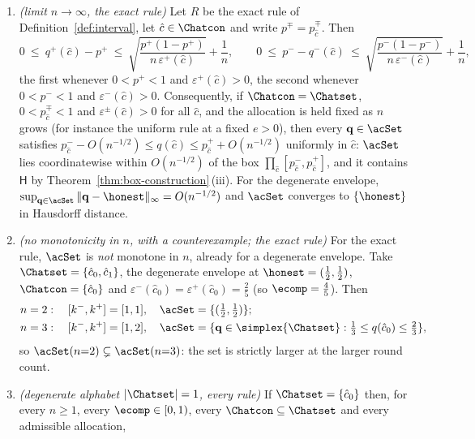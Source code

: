 \begin{theorem}
\begin{enumerate}[label=(\roman*),leftmargin=2.2em]
simplex and no constraint at all.
\item \emph{(limit $n\to\infty$, the exact rule)} Let $R$ be the exact rule
of Definition~\ref{def:interval}, let $\hat c\in\Chatcon$ and write
$p^{\mp}=p^{\mp}_{\hat c}$. Then
\begin{equation}\label{eq:width}
  0\ \le\ q^{+}(\hat c)-p^{+}\ \le\
  \sqrt{\frac{p^{+}(1-p^{+})}{n\,\varepsilon^{+}(\hat c)}}+\frac1n,
  \qquad
  0\ \le\ p^{-}-q^{-}(\hat c)\ \le\
  \sqrt{\frac{p^{-}(1-p^{-})}{n\,\varepsilon^{-}(\hat c)}}+\frac1n ,
\end{equation}
the first whenever $0<p^{+}<1$ and $\varepsilon^{+}(\hat c)>0$, the second
whenever $0<p^{-}<1$ and $\varepsilon^{-}(\hat c)>0$.
Consequently, if $\Chatcon=\Chatset$, $0<p^{\mp}_{\hat c}<1$ and
$\varepsilon^{\pm}(\hat c)>0$ for all $\hat c$, and the allocation is held
fixed as $n$ grows (for instance the uniform rule at a fixed $e>0$), then
every $\mathbf{q}\in\acSet$ satisfies
$p^{-}_{\hat c}-O(n^{-1/2})\le q(\hat c)\le p^{+}_{\hat c}+O(n^{-1/2})$
uniformly in $\hat c$: $\acSet$ lies coordinatewise within $O(n^{-1/2})$ of
the box $\prod_{\hat c}[p^{-}_{\hat c},p^{+}_{\hat c}]$, and it contains
$\mathsf{H}$ by Theorem~\ref{thm:box-construction}\,(iii). For the degenerate envelope,
$\sup_{\mathbf{q}\in\acSet}\|\mathbf{q}-\honest\|_{\infty}=O(n^{-1/2})$ and
$\acSet$ converges to $\{\honest\}$ in Hausdorff distance.
\item \emph{(no monotonicity in $n$, with a counterexample; the exact rule)}
For the exact rule, $\acSet$ is \emph{not} monotone in $n$, already for a
degenerate envelope. Take $\Chatset=\{\hat c_0,\hat c_1\}$, the degenerate
envelope at $\honest=(\tfrac12,\tfrac12)$, $\Chatcon=\{\hat c_0\}$ and
$\varepsilon^{-}(\hat c_0)=\varepsilon^{+}(\hat c_0)=\tfrac25$ (so
$\ecomp=\tfrac45$). Then
\begin{equation*}
\begin{aligned}
  n&=2:\quad [k^{-},k^{+}]=[1,1],\quad
   \acSet=\{(\tfrac12,\tfrac12)\};\\
  n&=3:\quad [k^{-},k^{+}]=[1,2],\quad
   \acSet=\{\mathbf{q}\in\simplex{\Chatset}:\tfrac13\le q(\hat
   c_0)\le\tfrac23\},
\end{aligned}
\end{equation*}
so $\acSet(n{=}2)\subsetneq\acSet(n{=}3)$: the set is strictly larger at the
larger round count.
\item \emph{(degenerate alphabet $|\Chatset|=1$, every rule)} If
$\Chatset=\{\hat c_0\}$ then, for every $n\ge1$, every $\ecomp\in[0,1)$,
every $\Chatcon\subseteq\Chatset$ and every admissible allocation,

\end{enumerate}
\end{theorem}
